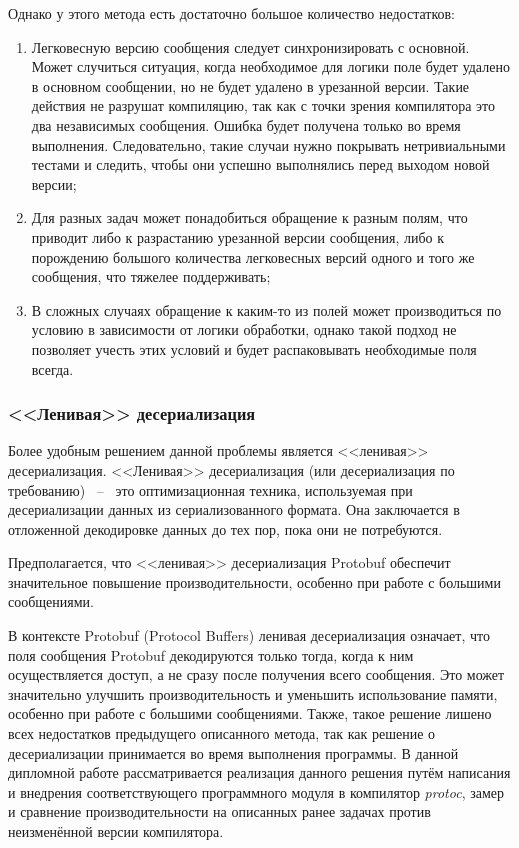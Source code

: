Однако у этого метода есть достаточно большое количество недостатков:
\begin{enumerate}
    \item Легковесную версию сообщения следует синхронизировать с основной. Может случиться ситуация, когда необходимое для логики поле будет удалено в основном сообщении, но не будет удалено в урезанной версии. Такие действия не разрушат компиляцию, так как с точки зрения компилятора это два независимых сообщения. Ошибка будет получена только во время выполнения. Следовательно, такие случаи нужно покрывать нетривиальными тестами и следить, чтобы они успешно выполнялись перед выходом новой версии;
    \item Для разных задач может понадобиться обращение к разным полям, что приводит либо к разрастанию урезанной версии сообщения, либо к порождению большого количества легковесных версий одного и того же сообщения, что тяжелее поддерживать;
    \item В сложных случаях обращение к каким-то из полей может производиться по условию в зависимости от логики обработки, однако такой подход не позволяет учесть этих условий и будет распаковывать необходимые поля всегда.
\end{enumerate}

\subsubsection{<<Ленивая>> десериализация} 

Более удобным решением данной проблемы является <<ленивая>> десериализация.
<<Ленивая>> десериализация (или десериализация по требованию) ~--~ это оптимизационная техника, используемая при десериализации данных из сериализованного формата\cite{clean_code}. 
Она заключается в отложенной декодировке данных до тех пор, пока они не потребуются.

Предполагается, что <<ленивая>> десериализация Protobuf обеспечит значительное повышение производительности, особенно при работе с большими сообщениями.

В контексте Protobuf (Protocol Buffers) ленивая десериализация означает, что поля сообщения Protobuf декодируются только тогда, когда к ним осуществляется доступ, а не сразу после получения всего сообщения. 
Это может значительно улучшить производительность и уменьшить использование памяти, особенно при работе с большими сообщениями.
Также, такое решение лишено всех недостатков предыдущего описанного метода, так как решение о десериализации принимается во время выполнения программы.
В данной дипломной работе рассматривается реализация данного решения путём написания и внедрения соответствующего программного модуля в компилятор \textit{protoc}, замер и сравнение производительности на описанных ранее задачах против неизменённой версии компилятора.
